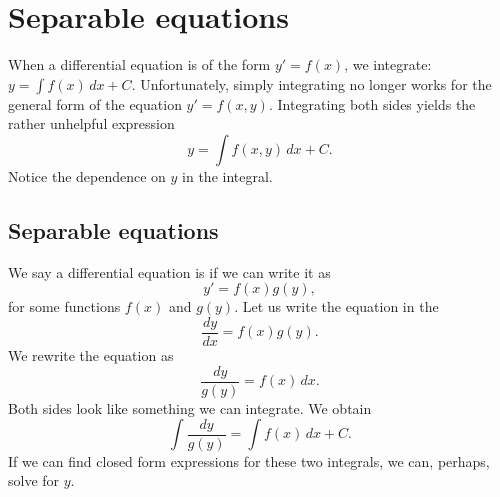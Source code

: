 \sectionnewpage
\section{Separable equations}
\label{separable:section}



When a differential equation is of the form
$y' = f(x)$,
we integrate:
$y = \int f(x) \,dx + C$. 
Unfortunately, simply integrating no longer works for the
general form of the equation
$y' = f(x,y)$.
Integrating both sides yields the rather unhelpful expression
\begin{equation*}
y = \int f(x,y) \,dx + C .
\end{equation*}
Notice the dependence on $y$ in the integral.

\subsection{Separable equations}

We say a differential equation is
\emph{}
if we can write it as
\begin{equation*}
y' = f(x)g(y) ,
\end{equation*}
for some functions $f(x)$ and $g(y)$.
Let us write the equation in the 
\begin{equation*}
\frac{dy}{dx} = f(x)g(y) .
\end{equation*}
We rewrite the equation as
\begin{equation*}
\frac{dy}{g(y)} = f(x) \,dx .
\end{equation*}
Both sides look like something we can integrate.  We obtain
\begin{equation*}
\int \frac{dy}{g(y)} = \int f(x) \,dx + C .
\end{equation*}
If we can find closed form expressions
for these two integrals, we can, perhaps, solve for $y$.

